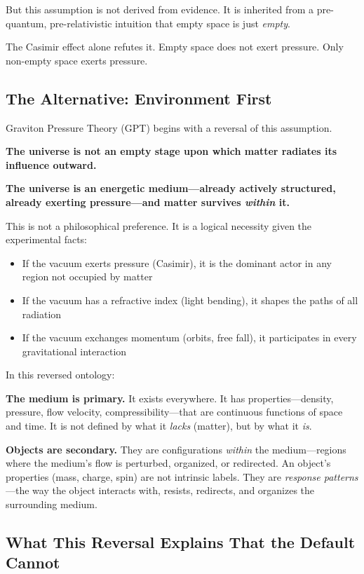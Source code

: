 \documentclass[12pt, a4paper]{article}
\begin{document}
But this assumption is not derived from evidence. It is inherited from a pre-quantum, pre-relativistic intuition that empty space is just \textit{empty}.

The Casimir effect alone refutes it. Empty space does not exert pressure. Only non-empty space exerts pressure.

\subsection{The Alternative: Environment First}
\label{subsec:environment_first_alt}

Graviton Pressure Theory (GPT) begins with a reversal of this assumption.

\textbf{The universe is not an empty stage upon which matter radiates its influence outward.}

\textbf{The universe is an energetic medium—already actively structured, already exerting pressure—and matter survives \textit{within} it.}

This is not a philosophical preference. It is a logical necessity given the experimental facts:

\begin{itemize}
    \item If the vacuum exerts pressure (Casimir), it is the dominant actor in any region not occupied by matter
    \item If the vacuum has a refractive index (light bending), it shapes the paths of all radiation
    \item If the vacuum exchanges momentum (orbits, free fall), it participates in every gravitational interaction
\end{itemize}

In this reversed ontology:

\textbf{The medium is primary.} It exists everywhere. It has properties—density, pressure, flow velocity, compressibility—that are continuous functions of space and time. It is not defined by what it \textit{lacks} (matter), but by what it \textit{is}.

\textbf{Objects are secondary.} They are configurations \textit{within} the medium—regions where the medium's flow is perturbed, organized, or redirected. An object's properties (mass, charge, spin) are not intrinsic labels. They are \textit{response patterns}—the way the object interacts with, resists, redirects, and organizes the surrounding medium.

\subsection{What This Reversal Explains That the Default Cannot}
\label{subsec:reversal_explains}
\end{document}
